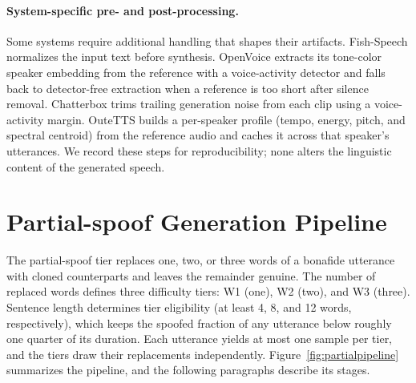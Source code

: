 \documentclass[11pt]{report}
\begin{document}
\paragraph{System-specific pre- and post-processing.} Some
systems require additional handling that shapes their artifacts.
Fish-Speech normalizes the input text before synthesis. OpenVoice
extracts its tone-color speaker embedding from the reference with a
voice-activity detector and falls back to detector-free extraction when
a reference is too short after silence removal. Chatterbox trims
trailing generation noise from each clip using a voice-activity margin.
OuteTTS builds a per-speaker profile (tempo, energy, pitch, and spectral
centroid) from the reference audio and caches it across that speaker's
utterances. We record these steps for reproducibility; none alters the
linguistic content of the generated speech.

\section{Partial-spoof Generation Pipeline}
\label{sec:partialspoof}

The partial-spoof tier replaces one, two, or three words
of a bonafide utterance with cloned counterparts and leaves the remainder
genuine. The number of replaced words defines three difficulty tiers: W1
(one), W2 (two), and W3 (three). Sentence length determines tier
eligibility (at least 4, 8, and 12 words, respectively), which keeps the
spoofed fraction of any utterance below roughly one quarter of its
duration. Each utterance yields at most one sample per tier, and the
tiers draw their replacements independently.
Figure~\ref{fig:partialpipeline} summarizes the pipeline, and the
following paragraphs describe its stages.
\end{document}
